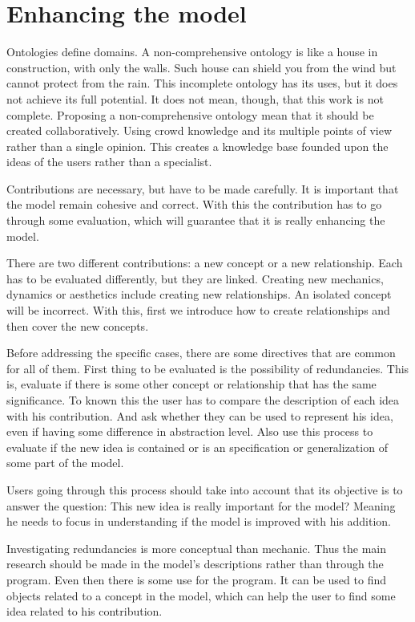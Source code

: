 \section{Enhancing the model}

Ontologies define domains. A non-comprehensive ontology is like a house in construction, with only the walls. Such house can shield you from the wind but cannot protect from the rain. This incomplete ontology has its uses, but it does not achieve its full potential. It does not mean, though, that this work is not complete. Proposing a non-comprehensive ontology mean that it should be created collaboratively. Using crowd knowledge and its multiple points of view rather than a single opinion. This creates a knowledge base founded upon the ideas of the users rather than a specialist.

Contributions are necessary, but have to be made carefully. It is important that the model remain cohesive and correct. With this the contribution has to go through some evaluation, which will guarantee that it is really enhancing the model.

There are two different contributions: a new concept or a new relationship. Each has to be evaluated differently, but they are linked. Creating new mechanics, dynamics or aesthetics include creating new relationships. An isolated concept will be incorrect. With this, first we introduce how to create relationships and then cover the new concepts. 

Before addressing the specific cases, there are some directives that are common for all of them. First thing to be evaluated is the possibility of redundancies. This is, evaluate if there is some other concept or relationship that has the same significance. To known this the user has to compare the description of each idea with his contribution. And ask whether they can be used to represent his idea, even if having some difference in abstraction level. Also use this process to evaluate if the new idea is contained or is an specification or generalization of some part of the model.

Users going through this process should take into account that its objective is to answer the question: This new idea is really important for the model? Meaning he needs to focus in understanding if the model is improved with his addition. 

Investigating redundancies is more conceptual than mechanic. Thus the main research should be made in the model's descriptions rather than through the program. Even then there is some use for the program. It can be used to find objects related to a concept in the model, which can help the user to find some idea related to his contribution.

